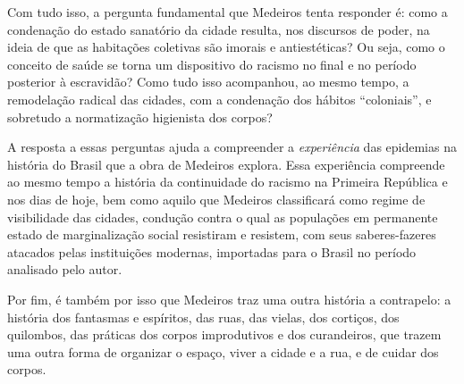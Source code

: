 \documentclass[12pt]{extarticle}
\begin{document}
Com tudo isso, a pergunta fundamental que Medeiros tenta responder é:
como a condenação do estado sanatório da cidade resulta, nos discursos
de poder, na ideia de que as habitações coletivas são imorais e
antiestéticas? Ou seja, como o conceito de saúde se torna um dispositivo
do racismo no final e no período posterior à escravidão? Como tudo isso
acompanhou, ao mesmo tempo, a remodelação radical das cidades, com a
condenação dos hábitos ``coloniais'', e sobretudo a normatização
higienista dos corpos?

A resposta a essas perguntas ajuda a compreender a \emph{experiência}
das epidemias na história do Brasil que a obra de Medeiros explora. Essa
experiência compreende ao mesmo tempo a história da continuidade do
racismo na Primeira República e nos dias de hoje, bem como aquilo que
Medeiros classificará como regime de visibilidade das cidades, condução
contra o qual as populações em permanente estado de marginalização
social resistiram e resistem, com seus saberes-fazeres atacados pelas
instituições modernas, importadas para o Brasil no período analisado
pelo autor.

Por fim, é também por isso que Medeiros traz uma outra história a
contrapelo: a história dos fantasmas e espíritos, das ruas, das vielas,
dos cortiços, dos quilombos, das práticas dos corpos improdutivos e dos
curandeiros, que trazem uma outra forma de organizar o espaço, viver a
cidade e a rua, e de cuidar dos corpos.


\end{document}
